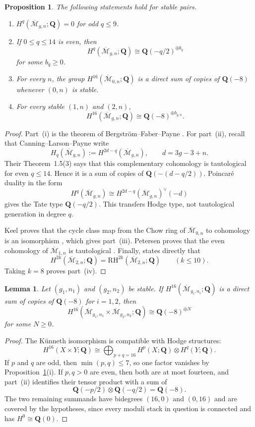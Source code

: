 \documentclass[12pt,reqno]{amsart}
\newcommand{\Q}{\mathbf{Q}}
\newcommand{\Mbar}{\overline{\mathcal{M}}}
\newcommand{\RH}{\mathrm{RH}}
\newtheorem{proposition}[theorem]{Proposition}
\newtheorem{lemma}[theorem]{Lemma}
\theoremstyle{definition}
\theoremstyle{remark}
\begin{document}
\begin{proposition}\label{prop:compact-inputs}
The following statements hold for stable pairs.
\begin{enumerate}[label=\textup{(\roman*)}]
\item $H^q(\Mbar_{g,n};\Q)=0$ for odd $q\leq9$.
\item If $0\leq q\leq14$ is even, then
\[
 H^q(\Mbar_{g,n};\Q)\cong\Q(-q/2)^{\oplus b_q}
\]
for some $b_q\geq0$.
\item For every $n$, the group $H^{16}(\Mbar_{0,n};\Q)$ is a direct sum of
copies of $\Q(-8)$ whenever $(0,n)$ is stable.
\item For every stable $(1,n)$ and $(2,n)$,
\[
 H^{16}(\Mbar_{g,n};\Q)\cong\Q(-8)^{\oplus b_{g,n}}.
\]
\end{enumerate}
\end{proposition}

\begin{proof}
Part~(i) is the theorem of Bergstr\"om--Faber--Payne
\cite[Theorem~1.1]{BFP}.  For part~(ii), recall that
Canning--Larson--Payne write
\[
 H_q(\Mbar_{g,n}):=H^{2d-q}(\Mbar_{g,n}),
 \qquad d=3g-3+n.
\]
Their Theorem~1.5(3) says that this complementary cohomology is
tautological for even $q\leq14$.  Hence it is a sum of copies of
$\Q(-(d-q/2))$.  Poincar\'e duality in the form
\[
 H^q(\Mbar_{g,n})
 \cong H^{2d-q}(\Mbar_{g,n})^\vee(-d)
\]
gives the Tate type $\Q(-q/2)$.  This transfers Hodge type, not
tautological generation in degree $q$.

Keel proves that the cycle class map from the Chow ring of
$\Mbar_{0,n}$ to cohomology is an isomorphism \cite{Keel}, which gives
part~(iii).  Petersen proves that the even cohomology of
$\Mbar_{1,n}$ is tautological \cite[Corollary~1.2]{PetersenGenusOne}.
Finally, \cite[Corollary~2.7]{CLP} states directly that
\[
 H^{2k}(\Mbar_{2,n};\Q)=\RH^{2k}(\Mbar_{2,n};\Q)
 \qquad(k\leq10).
\]
Taking $k=8$ proves part~(iv).
\end{proof}

\begin{lemma}\label{lem:kunneth}
Let $(g_1,n_1)$ and $(g_2,n_2)$ be stable.  If
$H^{16}(\Mbar_{g_i,n_i};\Q)$ is a direct sum of copies of $\Q(-8)$ for
$i=1,2$, then
\begin{equation}\label{eq:kunneth}
 H^{16}(\Mbar_{g_1,n_1}\times\Mbar_{g_2,n_2};\Q)
 \cong\Q(-8)^{\oplus N}
\end{equation}
for some $N\geq0$.
\end{lemma}

\begin{proof}
The K\"unneth isomorphism is compatible with Hodge structures:
\[
 H^{16}(X\times Y;\Q)
 \cong\bigoplus_{p+q=16}H^p(X;\Q)\otimes H^q(Y;\Q).
\]
If $p$ and $q$ are odd, then $\min(p,q)\leq7$, so one factor vanishes by
Proposition~\ref{prop:compact-inputs}(i).  If $p,q>0$ are even, then both
are at most fourteen, and part~(ii) identifies their tensor product with a
sum of
\[
 \Q(-p/2)\otimes\Q(-q/2)=\Q(-8).
\]
The two remaining summands have bidegrees $(16,0)$ and $(0,16)$ and are
covered by the hypotheses, since every moduli stack in question is
connected and has $H^0\cong\Q(0)$.
\end{proof}
\end{document}

